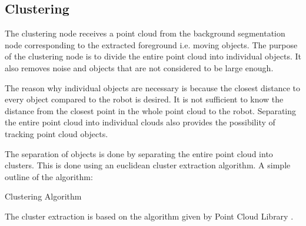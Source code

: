 
\subsection{Clustering}
The clustering node receives a point cloud from the background segmentation node corresponding to the extracted foreground i.e. moving objects. The purpose of the clustering node is to divide the entire point cloud into individual objects. It also removes noise and objects that are not considered to be large enough.  

The reason why individual objects are necessary is because the closest distance to every object compared to the robot is desired. It is not sufficient to know the distance from the closest point in the whole point cloud to the robot. Separating the entire point cloud into individual clouds also provides the possibility of tracking point cloud objects. 


The separation of objects is done by separating the entire point cloud into clusters. This is done using an euclidean cluster extraction algorithm. A simple outline of the algorithm:


\begin{algorithm}[H]
 \SetAlgoLined %
 \caption{Clustering Algorithm}
\end{algorithm}
 
The cluster extraction is based on the algorithm given by Point Cloud Library \cite{CE}.

